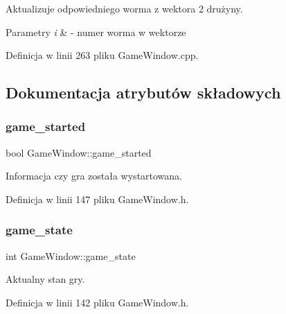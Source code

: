 Aktualizuje odpowiedniego worma z wektora 2 drużyny. 


\begin{DoxyParams}{Parametry}
{\em i} & -\/ numer worma w wektorze \\
\hline
\end{DoxyParams}


Definicja w linii 263 pliku Game\+Window.\+cpp.



\subsection{Dokumentacja atrybutów składowych}
\mbox{\label{class_game_window_a5ce0d59c491a490bc1d98afcac741016}} 
\subsubsection{\texorpdfstring{game\+\_\+started}{game\_started}}
{\footnotesize\ttfamily bool Game\+Window\+::game\+\_\+started}



Informacja czy gra została wystartowana. 



Definicja w linii 147 pliku Game\+Window.\+h.

\mbox{\label{class_game_window_aafe2b1768f704b81e4fe94115287b9f7}} 
\subsubsection{\texorpdfstring{game\+\_\+state}{game\_state}}
{\footnotesize\ttfamily int Game\+Window\+::game\+\_\+state}



Aktualny stan gry. 



Definicja w linii 142 pliku Game\+Window.\+h.

\mbox{\label{class_game_window_a3c63dc36f53ecb9b1d055923293daffd}} 
